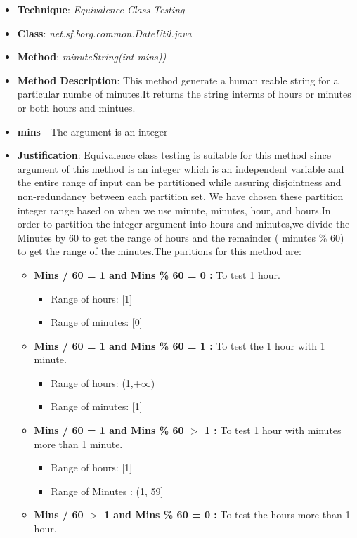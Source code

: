 \documentclass[fontsize=12pt,paper=letter,twoside]{scrartcl}
\begin{document}
\begin{itemize}
\item \textbf{Technique}: \emph{Equivalence Class Testing}
\item \textbf{Class}: \emph{net.sf.borg.common.DateUtil.java}
\item \textbf{Method}: \emph{minuteString(int mins))}
\item \textbf{Method Description}:
This method generate a human reable string for a particular numbe of minutes.It returns the string interms of hours or minutes or both hours and mintues.
\item \textbf{mins} - The argument is an integer
\item \textbf{Justification}: Equivalence class testing is suitable for this method since argument of this method is an integer which is an independent variable and the entire range of input can be partitioned while assuring disjointness and non-redundancy between each partition set. We have chosen these partition integer range based on when we use minute, minutes, hour, and hours.In order to partition the integer argument into hours and minutes,we divide the Minutes by 60 to get the range of hours and  the remainder ( minutes \% 60) to get the range of the minutes.The paritions for this method are:
 \begin{itemize}
\item \textbf{ Mins / 60 = 1 and Mins \% 60 = 0 :} To test 1 hour.
 \begin{itemize}
 \item Range of hours: [1]
 \item Range of minutes: [0]
\end{itemize}
\item \textbf{ Mins / 60 = 1 and Mins \% 60 = 1 :} To test the 1 hour with 1 minute.
 \begin{itemize}
 \item Range of hours: (1,$+\infty$)
 \item Range of minutes: [1]
\end{itemize}
\item \textbf{ Mins / 60 = 1 and Mins \% 60  $>$  1 :} To test 1 hour with minutes more than 1 minute. 
 \begin{itemize}
 \item  Range of hours: [1]
\item  Range of Minutes : (1, 59]
\end{itemize}
\item \textbf{ Mins / 60 $>$ 1 and Mins \% 60 = 0 :} To test the hours more than 1 hour.

\end{itemize}
\end{itemize}
\end{document}
